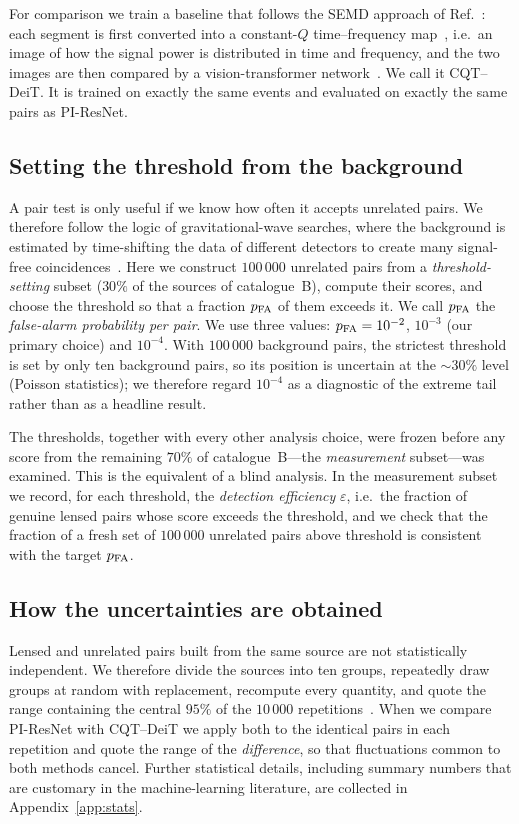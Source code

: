 \documentclass[aps,prd,twocolumn,superscriptaddress,nofootinbib,floatfix]{revtex4-2}
\newcommand{\pfa}{p_{\rm FA}}
\newcommand{\eff}{\varepsilon}
\newcommand{\PIR}{PI-ResNet}
\begin{document}
For comparison we train a baseline that follows the SEMD approach of Ref.~\cite{Li2025SEMD}: each segment is first converted into a constant-$Q$ time--frequency map~\cite{BrownCQT}, i.e.\ an image of how the signal power is distributed in time and frequency, and the two images are then compared by a vision-transformer network~\cite{DeiT}.
We call it CQT--DeiT.
It is trained on exactly the same events and evaluated on exactly the same pairs as \PIR{}.

\subsection{Setting the threshold from the background}
\label{sec:threshold}

A pair test is only useful if we know how often it accepts unrelated pairs.
We therefore follow the logic of gravitational-wave searches, where the background is estimated by time-shifting the data of different detectors to create many signal-free coincidences~\cite{GW150914search}.
Here we construct $100\,000$ unrelated pairs from a \emph{threshold-setting} subset ($30\%$ of the sources of catalogue~B), compute their scores, and choose the threshold so that a fraction $\pfa$ of them exceeds it.
We call $\pfa$ the \emph{false-alarm probability per pair}.
We use three values: $\pfa=10^{-2}$, $10^{-3}$ (our primary choice) and $10^{-4}$.
With $100\,000$ background pairs, the strictest threshold is set by only ten background pairs, so its position is uncertain at the ${\sim}30\%$ level (Poisson statistics); we therefore regard $10^{-4}$ as a diagnostic of the extreme tail rather than as a headline result.

The thresholds, together with every other analysis choice, were frozen before any score from the remaining $70\%$ of catalogue~B---the \emph{measurement} subset---was examined.
This is the equivalent of a blind analysis.
In the measurement subset we record, for each threshold, the \emph{detection efficiency} $\eff$, i.e.\ the fraction of genuine lensed pairs whose score exceeds the threshold, and we check that the fraction of a fresh set of $100\,000$ unrelated pairs above threshold is consistent with the target $\pfa$.

\subsection{How the uncertainties are obtained}

Lensed and unrelated pairs built from the same source are not statistically independent.
We therefore divide the sources into ten groups, repeatedly draw groups at random with replacement, recompute every quantity, and quote the range containing the central $95\%$ of the $10\,000$ repetitions~\cite{Efron1979}.
When we compare \PIR{} with CQT--DeiT we apply both to the identical pairs in each repetition and quote the range of the \emph{difference}, so that fluctuations common to both methods cancel.
Further statistical details, including summary numbers that are customary in the machine-learning literature, are collected in Appendix~\ref{app:stats}.
\end{document}
